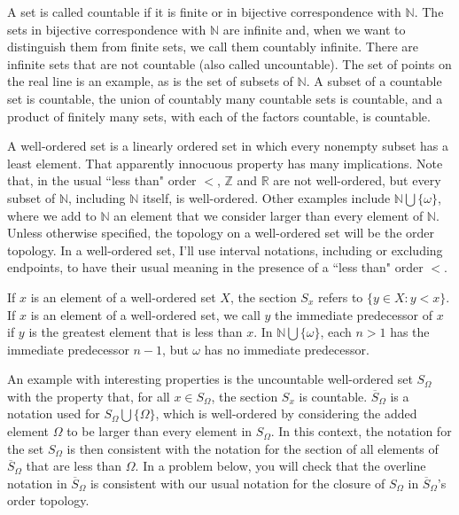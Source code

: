 \documentclass{amsart}
\theoremstyle{plain}
\theoremstyle{definition}
\theoremstyle{remark}
\begin{document}
A set is called countable if it is finite or in bijective correspondence with $\mathbb N$. The sets in bijective correspondence with $\mathbb N$ are infinite and, when we want to distinguish them from finite sets, we call them countably infinite. There are infinite sets that are not countable (also called uncountable). The set of points on the real line is an example, as is the set of subsets of $\mathbb N$. A subset of a countable set is countable, the union of countably many countable sets is countable, and a product of finitely many sets, with each of the factors countable, is countable. 

A well-ordered set is a linearly ordered set in which every nonempty subset has a least element. That apparently innocuous property has many implications. Note that, in the usual ``less than" order $<$, $\mathbb Z$ and $\mathbb R$ are not well-ordered, but every subset of $\mathbb N$, including $\mathbb N$ itself, is well-ordered. Other examples include $\mathbb N \bigcup \{ \omega\}$, where we add to $\mathbb N$ an element that we consider larger than every element of $\mathbb N$. Unless otherwise specified, the topology on a well-ordered set will be the order topology. In a well-ordered set, I'll use interval notations, including or excluding endpoints, to have their usual meaning in the presence of a ``less than" order $<$. 

If $x$ is an element of a well-ordered set $X$, the section $S_x$ refers to $\{ y \in X : y < x\}$.  If $x$ is an element of a well-ordered set, we call $y$ the immediate predecessor of $x$ if $y$ is the greatest element that is less than $x$. In $\mathbb N \bigcup \{ \omega\}$, each $n > 1$ has the immediate predecessor $n-1$, but $\omega$ has no immediate predecessor. 

An example with interesting properties is the uncountable well-ordered set $S_{\Omega}$ with the property that, for all $x \in S_{\Omega}$, the section $S_x$ is countable. $\overline{S} _{\Omega}$ is a notation used for $S_{\Omega} \bigcup \{ \Omega\}$, which is well-ordered by considering the added element $\Omega$ to be larger than every element in $S_{\Omega}$. In this context, the notation for the set $S_{\Omega}$ is then consistent with the notation for the section of all elements of $\overline{S} _{\Omega}$ that are less than $\Omega$. In a problem below, you will check that the overline notation in $\overline{S} _{\Omega}$ is consistent with our usual notation for the closure of $S_{\Omega}$ in $\overline{S} _{\Omega}$'s order topology. 
\end{document}

